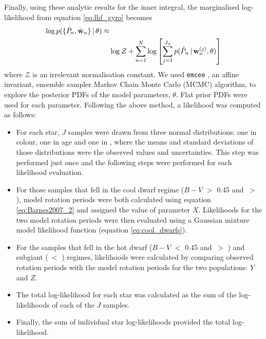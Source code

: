 Finally, using these analytic results for the inner integral, the
marginalised log-likelihood from equation \ref{eq:lhf_gyro} becomes
\begin{eqnarray}
	\log p(\{\hat{P}_n,\hat{\mathbf{w}}_n\}\,|\,\theta) \approx & \\ \nonumber
    & \log \mathcal{Z} + \sum_{n=1}^N
	\log \left[ \sum_{j=1}^{J_n}p(\hat{P}_n\,|\,\mathbf{w}_n^{(j)},
\theta) \right ]
\end{eqnarray}
where $\mathcal{Z}$ is an irrelevant normalisation constant.
We used {\tt emcee} \citep{Foreman-Mackey2013}, an affine invariant, ensemble
sampler Markov Chain Monte Carlo (MCMC) algorithm, to explore the posterior
PDFs of the model parameters, $\theta$.
Flat prior PDFs were used for each parameter.
Following the above method, a likelihood was computed as follows:
\begin{itemize}
	\item For each star, $J$ samples were drawn from three normal
		distributions: one in colour, one in age and one in \logg,
		where the means and standard deviations of those distributions
		were the observed values and uncertainties.
		This step was performed just once and the
		following steps were performed for each likelihood evaluation.
	\item For those samples that fell in the cool dwarf regime
		($B-V$ $>$ 0.45 and \logg$~>$ \subcut), model rotation
		periods were both calculated using equation
		\ref{eq:Barnes2007_2} and assigned the value of parameter $X$.
		Likelihoods for the two model rotation periods were then
		evaluated using a Gaussian mixture model
		likelihood function (equation \ref{eq:cool_dwarfs}).
	\item For the samples that fell in the hot dwarf ($B-V$ $<$ 0.45 and
		\logg$~>$ \subcut) and subgiant (\logg$~<$ \subcut) regimes,
		likelihoods were calculated by comparing observed rotation
		periods with the model rotation periods for the two
		populations: $Y$ and $Z$.
	\item The total log-likelihood for each star was calculated as the
		sum of the log-likelihoods of each of the $J$ samples.
	\item Finally, the sum of individual star log-likelihoods
		provided the total log-likelihood.
\end{itemize}

